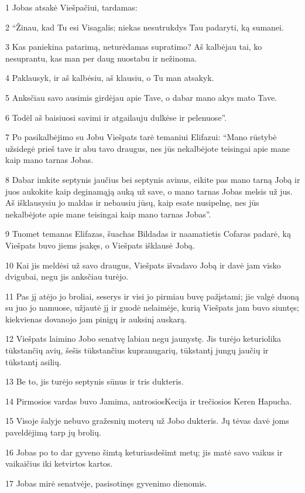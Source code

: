 \par 1 Jobas atsakė Viešpačiui, tardamas: 
\par 2 “Žinau, kad Tu esi Visagalis; niekas nesutrukdys Tau padaryti, ką sumanei. 
\par 3 Kas paniekina patarimą, neturėdamas supratimo? Aš kalbėjau tai, ko nesuprantu, kas man per daug nuostabu ir nežinoma. 
\par 4 Paklausyk, ir aš kalbėsiu, aš klausiu, o Tu man atsakyk. 
\par 5 Anksčiau savo ausimis girdėjau apie Tave, o dabar mano akys mato Tave. 
\par 6 Todėl aš baisiuosi savimi ir atgailauju dulkėse ir pelenuose”. 
\par 7 Po pasikalbėjimo su Jobu Viešpats tarė temaniui Elifazui: “Mano rūstybė užsidegė prieš tave ir abu tavo draugus, nes jūs nekalbėjote teisingai apie mane kaip mano tarnas Jobas. 
\par 8 Dabar imkite septynis jaučius bei septynis avinus, eikite pas mano tarną Jobą ir juos aukokite kaip deginamąją auką už save, o mano tarnas Jobas melsis už jus. Aš išklausysiu jo maldas ir nebausiu jūsų, kaip esate nusipelnę, nes jūs nekalbėjote apie mane teisingai kaip mano tarnas Jobas”. 
\par 9 Tuomet temanas Elifazas, šuachas Bildadas ir naamatietis Cofaras padarė, ką Viešpats buvo jiems įsakęs, o Viešpats išklausė Jobą. 
\par 10 Kai jis meldėsi už savo draugus, Viešpats išvadavo Jobą ir davė jam visko dvigubai, negu jis anksčiau turėjo. 
\par 11 Pas jį atėjo jo broliai, seserys ir visi jo pirmiau buvę pažįstami; jie valgė duoną su juo jo namuose, užjautė jį ir guodė nelaimėje, kurią Viešpats jam buvo siuntęs; kiekvienas dovanojo jam pinigų ir auksinį auskarą. 
\par 12 Viešpats laimino Jobo senatvę labiau negu jaunystę. Jis turėjo keturiolika tūkstančių avių, šešis tūkstančius kupranugarių, tūkstantį jungų jaučių ir tūkstantį asilių. 
\par 13 Be to, jis turėjo septynis sūnus ir tris dukteris. 
\par 14 Pirmosios vardas buvo Jamima, antrosios­Kecija ir trečiosios­ Keren Hapucha. 
\par 15 Visoje šalyje nebuvo gražesnių moterų už Jobo dukteris. Jų tėvas davė joms paveldėjimą tarp jų brolių. 
\par 16 Jobas po to dar gyveno šimtą keturiasdešimt metų; jis matė savo vaikus ir vaikaičius iki ketvirtos kartos. 
\par 17 Jobas mirė senatvėje, pasisotinęs gyvenimo dienomis.



